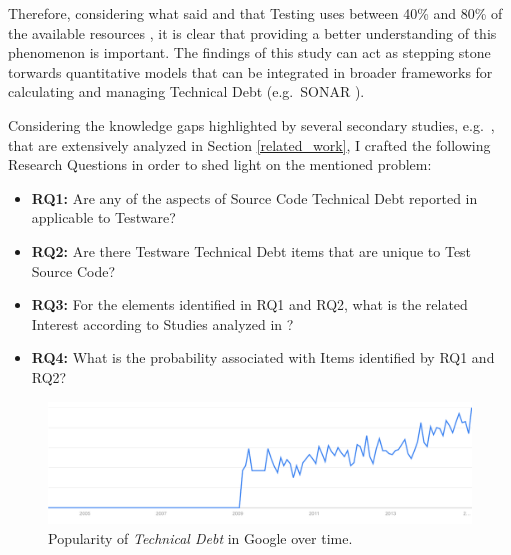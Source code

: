 Therefore, considering what said and that Testing uses between 40\% and 80\% of the available resources \cite{exploratorying_testing_td}, it is clear that providing a better understanding of this phenomenon is important. The findings of this study can act as stepping stone torwards quantitative models that can be integrated in broader frameworks for calculating and managing Technical Debt (e.g.\ SONAR \cite{sonar_evaluate_td}).

Considering the knowledge gaps highlighted by several secondary studies, e.g.\ \cite{mapping_study_td, exploration_of_td, exploration_of_td2}, that are extensively analyzed in Section \ref{related_work}, I crafted the following Research Questions in order to shed light on the mentioned problem:

\begin{itemize}
    \itemsep0em 
    
    \item \textbf{RQ1:} Are any of the aspects of Source Code Technical Debt reported in \cite{mapping_study_td} applicable to Testware?
    
    \item \textbf{RQ2:} Are there Testware Technical Debt items that are unique to Test Source Code?
    
    \item \textbf{RQ3:} For the elements identified in RQ1 and RQ2, what is the related Interest according to Studies analyzed in \cite{mapping_study_td}?
    
    \item \textbf{RQ4:} What is the probability associated with Items identified by RQ1 and RQ2?
    
\end{itemize}


\begin{figure}[h]
    \centering
    \includegraphics[width=\textwidth]{figure/technicalDebt.pdf}
    \caption{Popularity of \textit{Technical Debt} in Google over time.}
    \label{fig:technical_debt_trend}
\end{figure}

